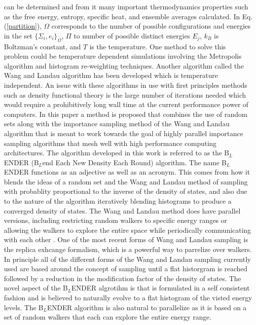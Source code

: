 \documentclass[aps,prl,reprint,superscriptaddress,showkeys]{revtex4-1}
\begin{document}
can be  determined and from it many important thermodynamics properties such as the free energy, entropy, specific heat, and ensemble averages calculated. In Eq. (\ref{partition}), $\Omega$ corresponds to the number of possible configurations and energies in the set $\{\Sigma_i,e_i\}_\Omega$, $\Pi$ to number of possible distinct energies $E_j$, $k_B$ is Boltzman's constant, and $T$ is the temperature. One method to solve this problem could be temperature dependent simulations involving the  Metropolis algorithm and histogram re-weighting techniques\cite{metropolis_equation_1953, landau_MC_simulations}.   Another algorithm called the  Wang and Landau algorithm\cite{WL_phys_rev_lett} has been developed which is temperature independent.  An issue with these algorithms in use with first principles methods such as density functional theory is the large number of iterations needed which would require a prohibitively long wall time at the current performance power of computers.  In this paper a method is proposed that combines the use of random sets along with the importance sampling method of the Wang and Landau algorithm that is meant to work towards the goal of highly parallel importance sampling algorithms that mesh well with high performance computing architectures. The algorithm developed in this work is referred to as the B$_{L}$ENDER (B$_{L}$end Each New Density Each Round) algorithm. The name B$_{L}$ENDER functions as an  adjective as well as an acronym. This comes from how it blends the ideas of a random set and the Wang and Landau method of sampling with probablity proportional to the inverse of the density of states, and also due to the nature of the algorithm iteratively blending histograms to produce a converged density of states.  The Wang and Landau method does have parallel versions, including  restricting random walkers to specific energy ranges or allowing the walkers to explore the entire space while periodically communicating with each other \cite{MP_Wang_Landau,P_imp_Wang_Landau, Hframe_Wang_Landau}. One of the most recent forms of Wang and Landau sampling is the replica exhcange formalism, which is a powerful way to parrelize over walkers. In principle all of the different forms of the Wang and Landau sampling currently used are based around the concept of sampling until a flat historgram is reached followed by a reduction in the modification factor of the density of states.  The novel aspect of the B$_{L}$ENDER algrotihm is that is formulated in a self consistent fashion and is believed to naturally evolve to a flat histogram of the visted energy levels.  The B$_{L}$ENDER algorithm is also natural to parallelize as it is based on a set of random walkers that each can explore the entire energy range. 
\end{document}
